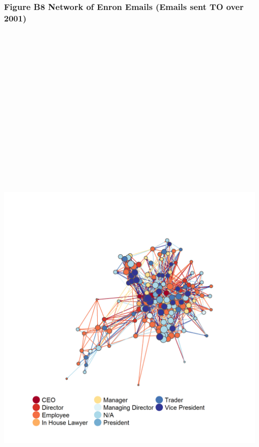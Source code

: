 \documentclass[]{article}
\begin{document}
\newpage

\subsubsection{Figure B8 Network of Enron Emails (Emails sent TO over
2001)}\label{figure-b8-network-of-enron-emails-emails-sent-to-over-2001}

\section{\texorpdfstring{\protect\includegraphics[height=12.50000in]{images/n_to_01.png}}{Network of Enron Emails}}\label{network-of-enron-emails-5}
\end{document}
